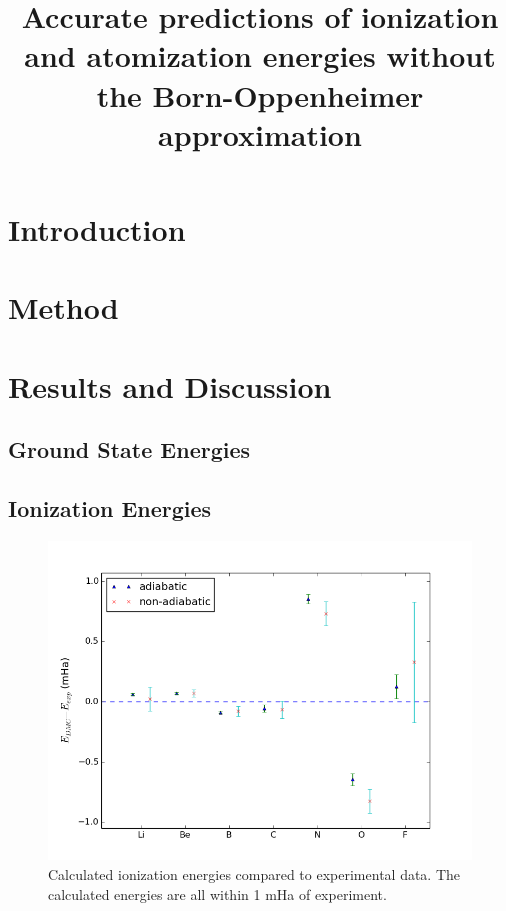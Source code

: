 \documentclass[pra,superscriptaddress,groupedaddress,twocolumn]{revtex4}
\begin{document}
\title{Accurate predictions of ionization and atomization energies without the Born-Oppenheimer approximation}


\maketitle

\section{Introduction}


\section{Method}


\section{Results and Discussion}


\subsection{Ground State Energies}


\subsection{Ionization Energies}

\begin{figure}[h]
\includegraphics[scale=.45]{Figures/ionization}
\caption{Calculated ionization energies compared to experimental data. The calculated energies are all within 1 mHa of experiment.}
\end{figure}
\end{document}

